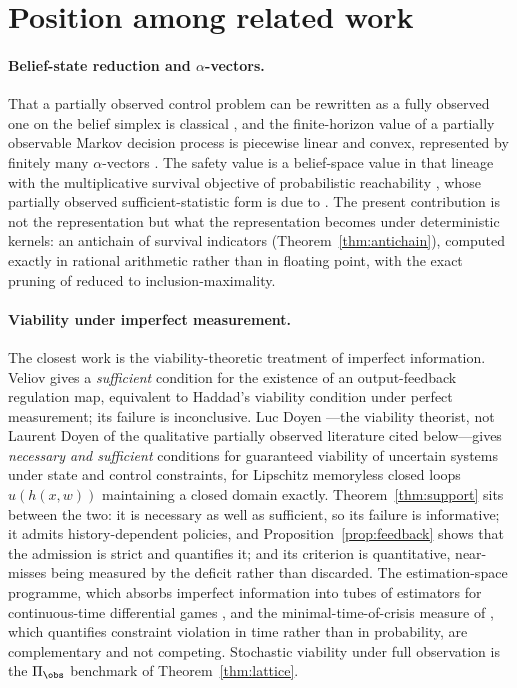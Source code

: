\section{Position among related work}\label{sec:related}

\paragraph{Belief-state reduction and $\alpha$-vectors.}
That a partially observed control problem can be rewritten as a fully observed one on the belief simplex is classical \cite{Astrom1965,BertsekasShreve1978}, and the finite-horizon value of a partially observable Markov decision process is piecewise linear and convex, represented by finitely many $\alpha$-vectors \cite{SmallwoodSondik1973,Monahan1982,Kaelbling1998}. The safety value is a belief-space value in that lineage with the multiplicative survival objective of probabilistic reachability \cite{Abate2008}, whose partially observed sufficient-statistic form is due to \cite{LesserOishi2014}. The present contribution is not the representation but what the representation becomes under deterministic kernels: an antichain of survival indicators (Theorem~\ref{thm:antichain}), computed exactly in rational arithmetic rather than in floating point, with the exact pruning of \cite{Cassandra1997} reduced to inclusion-maximality.

\paragraph{Viability under imperfect measurement.}
The closest work is the viability-theoretic treatment of imperfect information. Veliov \cite{Veliov1993} gives a \emph{sufficient} condition for the existence of an output-feedback regulation map, equivalent to Haddad's viability condition under perfect measurement; its failure is inconclusive. Luc Doyen \cite{Doyen2000}---the viability theorist, not Laurent Doyen of the qualitative partially observed literature cited below---gives \emph{necessary and sufficient} conditions for guaranteed viability of uncertain systems under state and control constraints, for Lipschitz memoryless closed loops $u(h(x,w))$ maintaining a closed domain exactly. Theorem~\ref{thm:support} sits between the two: it is necessary as well as sufficient, so its failure is informative; it admits history-dependent policies, and Proposition~\ref{prop:feedback} shows that the admission is strict and quantifies it; and its criterion is quantitative, near-misses being measured by the deficit rather than discarded. The estimation-space programme, which absorbs imperfect information into tubes of estimators for continuous-time differential games \cite{Cardaliaguet2007}, and the minimal-time-of-crisis measure of \cite{DoyenSaintPierre1997}, which quantifies constraint violation in time rather than in probability, are complementary and not competing. Stochastic viability under full observation \cite{DeLaraDoyen2008,DoyenDeLara2010} is the $\Pi_{\obs}$ benchmark of Theorem~\ref{thm:lattice}.

